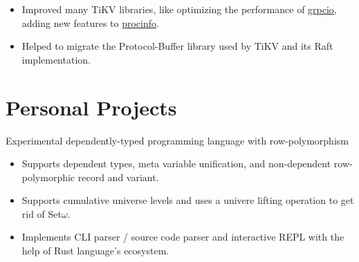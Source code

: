\documentclass{resume}
\begin{document}
\begin{itemize}
  \item Improved many TiKV libraries, like
    optimizing the performance of
    \href{https://docs.rs/crate/grpcio} {grpcio},
    adding new features to
    \href{https://docs.rs/crate/procinfo} {procinfo}.
  \item Helped to migrate the Protocol-Buffer library used by TiKV and its Raft implementation.
\end{itemize}

\section{Personal Projects}


Experimental dependently-typed programming language with row-polymorphism
\begin{itemize}
  \item Supports dependent types, meta variable unification, and non-dependent row-polymorphic record and variant.
  \item Supports cumulative universe levels and uses a univere lifting operation to get rid of Set$\omega$.
  \item Implements CLI parser / source code parser and interactive REPL with the help of Rust language's ecosystem.
\end{itemize}
\end{document}
